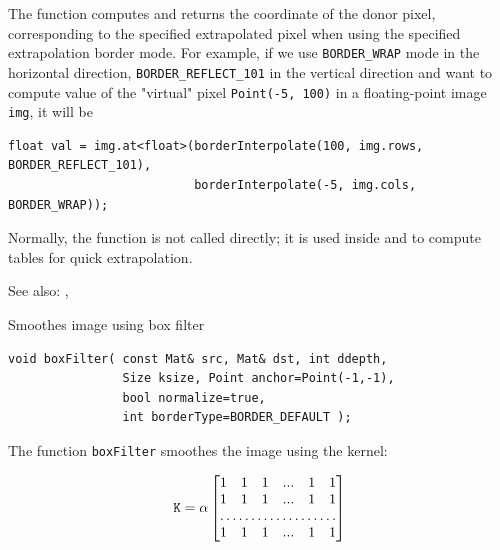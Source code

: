 The function computes and returns the coordinate of the donor pixel, corresponding to the specified extrapolated pixel when using the specified extrapolation border mode. For example, if we use \texttt{BORDER\_WRAP} mode in the horizontal direction, \texttt{BORDER\_REFLECT\_101} in the vertical direction and want to compute value of the "virtual" pixel \texttt{Point(-5, 100)} in a floating-point image \texttt{img}, it will be

\begin{lstlisting}
float val = img.at<float>(borderInterpolate(100, img.rows, BORDER_REFLECT_101),
                          borderInterpolate(-5, img.cols, BORDER_WRAP));
\end{lstlisting}

Normally, the function is not called directly; it is used inside  and  to compute tables for quick extrapolation.

See also: , 

\label{boxFilter}
Smoothes image using box filter

\begin{lstlisting}
void boxFilter( const Mat& src, Mat& dst, int ddepth,
                Size ksize, Point anchor=Point(-1,-1),
                bool normalize=true,
                int borderType=BORDER_DEFAULT );
\end{lstlisting}
\begin{description}
\end{description}

The function \texttt{boxFilter} smoothes the image using the kernel:

\[ \texttt{K} = \alpha
\begin{bmatrix}
1 & 1 & 1 & ... & 1 & 1 \\
1 & 1 & 1 & ... & 1 & 1 \\
\hdotsfor{6} \\
1 & 1 & 1 & ... & 1 & 1
\end{bmatrix}
\]


